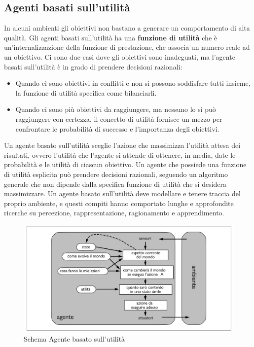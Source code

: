 \documentclass{article}
\begin{document}
\subsection{Agenti basati sull'utilità}
In alcuni ambienti gli obiettivi non bastano a generare un comportamento di alta qualità. Gli agenti basati sull'utilità ha una \textbf{funzione di utilità} che è un'internalizzazione della funzione di prestazione, che associa un numero reale ad un obiettivo. Ci sono due casi dove gli obiettivi sono inadeguati, ma l'agente basati sull'utilità è in grado di prendere decisioni razionali:
\begin{itemize}
    \item Quando ci sono obiettivi in conflitti e non si possono soddisfare tutti insieme, la funzione di utilità specifica come bilanciarli.
    \item Quando ci sono più obiettivi da raggiungere, ma nessuno lo si può raggiungere con certezza, il concetto di utilità fornisce un mezzo per confrontare le probabilità di successo e l'importanza degli obiettivi.
\end{itemize}
\noindent Un agente basato sull'utilità sceglie l'azione che massimizza l'utilità attesa dei risultati, ovvero l'utilità che l'agente si attende di ottenere, in media, date le probabilità e le utilità di ciascun obiettivo.\newline
\noindent Un agente che possiede una funzione di utilità esplicita può prendere decisioni razionali, seguendo un algoritmo generale che non dipende dalla specifica funzione di utilità che si desidera massimizzare.\newline
\noindent Un agente basato sull'utilità deve modellare e tenere traccia del proprio ambiente, e questi compiti hanno comportato lunghe e approfondite ricerche su percezione, rappresentazione, ragionamento e apprendimento.
\begin{figure}[H]
    \centering
    \includegraphics[width=0.5\linewidth]{Images/AgenteBasatoUtilita.png}
    \caption{Schema Agente basato sull'utilità}
    \label{fig:enter-label}
\end{figure}
\newpage
\end{document}
